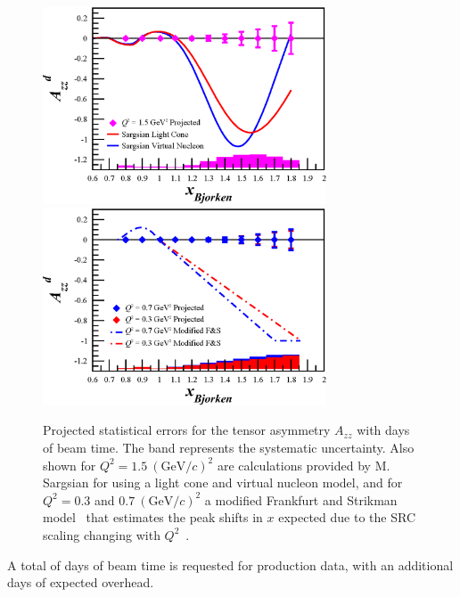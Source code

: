 \begin{figure}
\begin{center}
\includegraphics[width=0.75\textwidth]{figs/Pzz_30_q2_15_Azz_w_misak.eps} \\
\includegraphics[width=0.75\textwidth]{figs/Pzz_30_q2_03_07_Azz_fs.eps} 
\caption{\label{PROJ}Projected statistical errors for the tensor asymmetry $A_{zz}$ with \productiondays days of beam time. The band represents the systematic uncertainty. Also shown for $Q^2=1.5~(\mathrm{GeV}/c)^2$ are calculations provided by M. Sargsian for using a light cone and virtual nucleon model, and for $Q^2=0.3$ and $0.7~(\mathrm{GeV}/c)^2$ a modified Frankfurt and Strikman model~\cite{Frankfurt:1988nt} that estimates the peak shifts in $x$ expected due to the SRC scaling changing with $Q^2$~\cite{Frankfurt:2008zv}.
}
\end{center}
\end{figure}

A total of \productiondays days of beam time is requested for production data, with an additional \overheaddays days of expected overhead.



\clearpage

%





